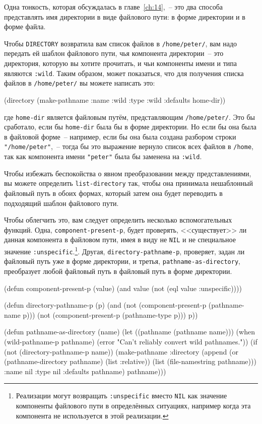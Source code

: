 Одна тонкость, которая обсуждалась в главе~\ref{ch:14},~-- это два способа представлять
имя директории в виде файлового пути: в форме директории и в форме файла.

Чтобы \lstinline{DIRECTORY} возвратила вам список файлов в \lstinline{/home/peter/}, вам надо
передать ей шаблон файлового пути, чья компонента директории~-- это директория, которую
вы хотите прочитать, и чьи компоненты имени и типа являются \lstinline{:wild}. Таким образом,
может показаться, что для получения списка файлов в \lstinline{/home/peter/} вы можете написать
это:

\begin{myverb}
(directory (make-pathname :name :wild :type :wild :defaults home-dir))
\end{myverb}

\noindent{}где \lstinline{home-dir} является файловым путём, представляющим \lstinline{/home/peter/}. Это бы
сработало, если бы \lstinline{home-dir} была бы в форме директории. Но если бы она была в
файловой форме~-- например, если бы она была создана разбором строки
\lstinline{"/home/peter"},~-- тогда бы это выражение вернуло список всех файлов в
\lstinline{/home}, так как компонента имени \lstinline{"peter"} была бы заменена на
\lstinline{:wild}.

Чтобы избежать беспокойства о явном преобразовании между представлениями, вы можете
определить \lstinline{list-directory} так, чтобы она принимала нешаблонный файловый путь в
обоих формах, который затем она будет переводить в подходящий шаблон файлового пути.

Чтобы облегчить это, вам следует определить несколько вспомогательных функций. Одна,
\lstinline{component-present-p}, будет проверять, <<существует>> ли данная компонента в
файловом пути, имея в виду не \lstinline{NIL} и не специальное значение
\lstinline{:unspecific}.\footnote{Реализации могут возвращать \lstinline{:unspecific}
  вместо \lstinline{NIL} как значение компоненты файлового пути в определённых ситуациях,
  например когда эта компонента не используется в этой реализации.}. Другая,
\lstinline{directory-pathname-p}, проверяет, задан ли файловый путь уже в форме
директории, и \mbox{третья}, \lstinline{pathname-as-directory}, преобразует любой файловый
путь в файловый путь в форме директории.

\begin{myverb}
(defun component-present-p (value)
  (and value (not (eql value :unspecific))))

(defun directory-pathname-p  (p)
  (and
   (not (component-present-p (pathname-name p)))
   (not (component-present-p (pathname-type p)))
   p))

(defun pathname-as-directory (name)
  (let ((pathname (pathname name)))
    (when (wild-pathname-p pathname)
      (error "Can't reliably convert wild pathnames."))
    (if (not (directory-pathname-p name))
      (make-pathname
       :directory (append (or (pathname-directory pathname) (list :relative))
                          (list (file-namestring pathname)))
       :name      nil
       :type      nil
       :defaults pathname)
      pathname)))
\end{myverb}

